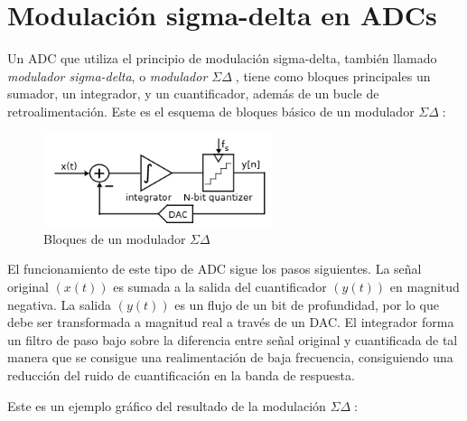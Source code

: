 \documentclass[12pt]{report} %
\newcommand{\sigmadelta}{$\Sigma\Delta\; $}
\begin{document}
	\section{Modulación sigma-delta en ADCs}
	
	Un ADC que utiliza el principio de modulación sigma-delta, también llamado \textit{modulador sigma-delta}, o \textit{modulador \sigmadelta}, tiene como bloques principales un sumador, un integrador, y un cuantificador, además de un bucle de retroalimentación. Este es el esquema de bloques básico de un modulador \sigmadelta:
	
	\begin{figure}[H]
		\includegraphics[width=0.6\textwidth]{sigma-delta-blocks.png}
		\caption[Bloques de un modulador \sigmadelta]{Bloques de un modulador \sigmadelta\protect\footnotemark}
		\label{fig:sigma-delta-blocks.png}
	\end{figure}
	
	El funcionamiento de este tipo de ADC sigue los pasos siguientes. La señal original \begin{math}( x(t) )\end{math} es sumada a la salida del cuantificador \begin{math}( y(t) )\end{math} en magnitud negativa. La salida \begin{math}( y(t) )\end{math} es un flujo de un bit de profundidad, por lo que debe ser transformada a magnitud real a través de un DAC. El integrador forma un filtro de paso bajo sobre la diferencia entre señal original y cuantificada de tal manera que se consigue una realimentación de baja frecuencia, consiguiendo una reducción del ruido de cuantificación en la banda de respuesta.
	
	Este es un ejemplo gráfico del resultado de la modulación \sigmadelta:
	
\end{document}
